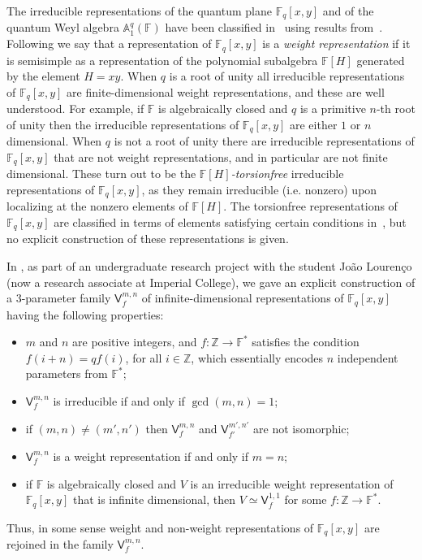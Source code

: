 \documentclass{commat}
\newcommand{\FF}{\mathbb{F}}
\newcommand{\wa}[1][1]{\mathbb{A}_{#1}}
\newcommand{\ZZ}{\mathbb{Z}}
\begin{document}
The irreducible representations of the quantum plane $\FF_q[x, y]$ and of the quantum Weyl algebra $\wa^q(\FF)$ have been classified in~\cite{vB97} using results from~\cite{BvO97}. Following \cite{vB97} we say that a representation of $\FF_q[x, y]$ is a \emph{weight representation} if it is semisimple as a representation of the polynomial subalgebra $\FF[H]$ generated by the element $H=xy$. When $q$ is a root of unity all irreducible representations of $\FF_q[x, y]$ are finite-dimensional weight representations, and these are well understood. For example, if $\FF$ is algebraically closed and $q$ is a primitive $n$-th root of unity then the irreducible representations of $\FF_q[x, y]$ are either $1$ or $n$ dimensional. When $q$ is not a root of unity there are irreducible representations of $\FF_q[x, y]$ that are not weight representations, and in particular are not finite dimensional. These turn out to be the \emph{$\FF[H]$-torsionfree} irreducible representations of $\FF_q[x, y]$, as they remain irreducible (i.e. nonzero) upon localizing at the nonzero elements of $\FF[H]$.  The torsionfree representations of $\FF_q[x, y]$ are classified in terms of elements satisfying certain conditions in~\cite[Cor.\ 3.3]{vB97}, but no explicit construction of these representations is given.

In \cite{LL15}, as part of an undergraduate research project with the student João Lourenço (now a research associate at Imperial College), we gave an explicit construction of a 3-parameter family $\mathsf{V}^{m,n}_{f}$ of infinite-dimensional representations of $\FF_q[x, y]$ having the following properties:
\begin{itemize}
	\item $m$ and $n$ are positive integers, and $f:\mathbb{Z} \rightarrow \FF^{*}$ satisfies the condition $f(i+n)=qf(i)$, for all $i\in\ZZ$, which essentially encodes $n$ independent parameters from $\FF^*$;
	\item $\mathsf{V}^{m,n}_{f}$ is irreducible if and only if $\gcd(m, n)=1$;
	\item if $(m, n)\neq (m', n')$ then $\mathsf{V}^{m,n}_{f}$ and $\mathsf{V}^{m',n'}_{f'}$ are not isomorphic;
	\item $\mathsf{V}^{m,n}_{f}$ is a weight representation if and only if $m=n$;
	\item if $\FF$ is algebraically closed and $V$ is an irreducible weight representation of $\FF_q[x, y]$ that is infinite dimensional, then $V\simeq\mathsf{V}^{1,1}_{f}$ for some $f:\mathbb{Z} \rightarrow \FF^{*}$.
\end{itemize}
Thus, in some sense weight and non-weight representations of $\FF_q[x, y]$ are rejoined in the family $\mathsf{V}^{m,n}_{f}$.
\end{document}
